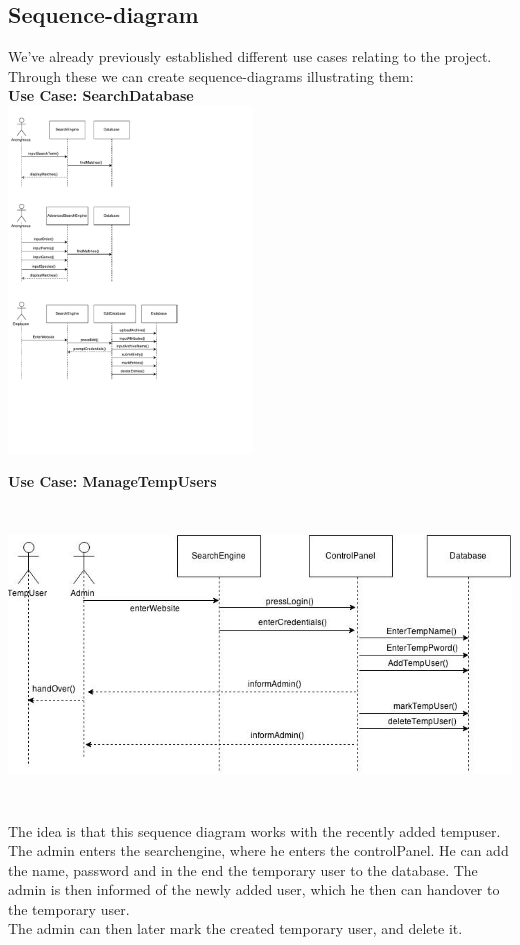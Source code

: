 \documentclass[12pt,a4paper]{article}
\begin{document}
\newpage
\subsection{Sequence-diagram}
We've already previously established different use cases relating to the project. Through these we can create sequence-diagrams illustrating them:
\\

{\bf Use Case: SearchDatabase}\\

\includegraphics[height=92mm]{Sequence1.pdf}

{\bf Use Case: ManageTempUsers}\\

\includegraphics[height=86mm]{Sequence2.jpg}
The idea is that this sequence diagram works with the recently added tempuser. The admin enters the searchengine, where he enters the controlPanel. He can add the name, password and in the end the temporary user to the database. The admin is then informed of the newly added user, which he then can handover to the temporary user.\\
The admin can then later mark the created temporary user, and delete it. 
\\
\end{document}
